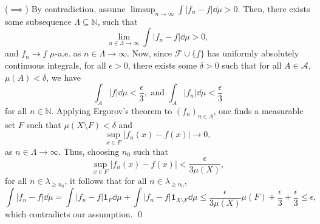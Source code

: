 \documentclass[
]{article}
\theoremstyle{definition}
\theoremstyle{definition}
\begin{document}
(\(\implies\)) By contradiction, assume
\(\limsup_{n \to \infty} \int |f_n - f| \dd\mu > 0\). Then, there exists
some subsequence \(\Lambda \subseteq \mathbb{N}\), such that
\[\lim_{n \in \Lambda \to \infty}\int |f_n - f| \dd \mu > 0,\] and
\(f_n \to f\) \(\mu\)-a.e. as \(n \in \Lambda \to \infty\). Now, since
\(\mathcal{F} \cup \{f\}\) has uniformly absolutely continuous
integrals, for all \(\epsilon > 0\), there exists some \(\delta > 0\)
such that for all \(A \in \mathcal{A}\), \(\mu(A) < \delta\), we have
\[\int_A |f| \dd\mu < \frac{\epsilon}{3}, \text{ and } \int_A |f_n| \dd\mu < \frac{\epsilon}{3}\]
for all \(n \in \mathbb{N}\). Applying Ergorov's theorem to
\((f_n)_{n \in \Lambda}\), one finds a measurable set \(F\) such that
\(\mu(X \setminus F) < \delta\) and
\[\sup_{x \in F} |f_n(x) - f(x)| \to 0,\] as
\(n \in \Lambda \to \infty\). Thus, choosing \(n_0\) such that
\[\sup_{x \in F} |f_n(x) - f(x)| < \frac{\epsilon}{3 \mu(X)},\] for all
\(n \in \lambda_{\ge n_0}\), it follows that for all
\(n \in \lambda_{\ge n_0}\),
\[\int |f_n - f| \dd \mu = \int |f_n - f| \mathbf{1}_F \dd \mu + 
    \int |f_n - f| \mathbf{1}_{X \setminus F} \dd\mu \le 
    \frac{\epsilon}{3\mu(X)} \mu(F) + 
    \frac{\epsilon}{3} + \frac{\epsilon}{3} \le \epsilon,\] which
contradicts our assumption. \qed
\end{document}
